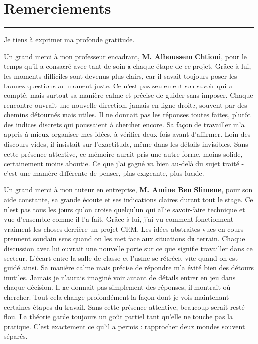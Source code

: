 \chapter*{Remerciements}

\selectfont
\linespread{1.0}

\noindent\rule{\textwidth}{2pt}

\vspace{0.3cm}

{\large Je tiens à exprimer ma profonde gratitude.}

\vspace{0.3cm}

Un grand merci à mon professeur encadrant, \textbf{M. Alhoussem Chtioui}, pour le temps qu’il a consacré avec tant de soin à chaque étape de ce projet. Grâce à lui, les moments difficiles sont devenus plus clairs, car il savait toujours poser les bonnes questions au moment juste. Ce n’est pas seulement son savoir qui a compté, mais surtout sa manière calme et précise de guider sans imposer. Chaque rencontre ouvrait une nouvelle direction, jamais en ligne droite, souvent par des chemins détournés mais utiles. Il ne donnait pas les réponses toutes faites, plutôt des indices discrets qui poussaient à chercher encore. Sa façon de travailler m’a appris à mieux organiser mes idées, à vérifier deux fois avant d’affirmer. Loin des discours vides, il insistait sur l’exactitude, même dans les détails invisibles. Sans cette présence attentive, ce mémoire aurait pris une autre forme, moins solide, certainement moins aboutie. Ce que j’ai gagné va bien au-delà du sujet traité - c’est une manière différente de penser, plus exigeante, plus lucide.

\vspace{0.3cm}

Un grand merci à mon tuteur en entreprise, \textbf{M. Amine Ben Slimene}, pour son aide constante, sa grande écoute et ses indications claires durant tout le stage. Ce n’est pas tous les jours qu’on croise quelqu’un qui allie savoir-faire technique et vue d’ensemble comme il l’a fait. Grâce à lui, j’ai vu comment fonctionnent vraiment les choses derrière un projet CRM. Les idées abstraites vues en cours prennent soudain sens quand on les met face aux situations du terrain. Chaque discussion avec lui ouvrait une nouvelle porte sur ce que signifie travailler dans ce secteur. L’écart entre la salle de classe et l’usine se rétrécit vite quand on est guidé ainsi. Sa manière calme mais précise de répondre m’a évité bien des détours inutiles. Jamais je n’aurais imaginé voir autant de détails entrer en jeu dans chaque décision. Il ne donnait pas simplement des réponses, il montrait où chercher. Tout cela change profondément la façon dont je vois maintenant certaines étapes du travail. Sans cette présence attentive, beaucoup serait resté flou. La théorie garde toujours un goût partiel tant qu’elle ne touche pas la pratique. C’est exactement ce qu’il a permis : rapprocher deux mondes souvent séparés.

